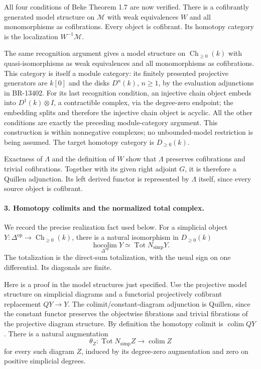 \documentclass[11pt,a4paper]{article}
\theoremstyle{definition}\newtheorem{definition}[theorem]{Definition}
\theoremstyle{remark}\newtheorem{remark}[theorem]{Remark}
\begin{document}
All four conditions of Beke Theorem 1.7 are now verified.
There is a cofibrantly generated model structure on
\(\mathcal M\) with weak equivalences \(W\) and all monomorphisms
as cofibrations.  Every object is cofibrant.  Its homotopy
category is the localization \(W^{-1}\mathcal M\).

The same recognition argument gives a model structure on
\(\operatorname{Ch}_{\ge0}(k)\) with quasi-isomorphisms as weak
equivalences and all monomorphisms as cofibrations.
This category is itself a module category: its finitely presented
projective generators are \(k[0]\) and the disks \(D^n(k)\),
\(n\ge1\), by the evaluation adjunctions in BR-13402.
For its last recognition condition, an injective chain object
embeds into \(D^1(k)\otimes I\), a contractible complex, via
the degree-zero endpoint; the embedding splits and therefore
the injective chain object is acyclic.  All the other
conditions are exactly the preceding module-category argument.
This construction is within nonnegative complexes; no
unbounded-model restriction is being assumed.
The target homotopy category is \(D_{\ge0}(k)\).

Exactness of \(\Lambda\) and the definition of \(W\) show that
\(\Lambda\) preserves cofibrations and trivial cofibrations.
Together with its given right adjoint \(G\), it is therefore
a Quillen adjunction.  Its left derived functor is represented
by \(\Lambda\) itself, since every source object is cofibrant.

\paragraph{3. Homotopy colimits and the normalized total complex.}
We record the precise realization fact used below.
For a simplicial object
\(Y:\Delta^{\mathrm{op}}\to\operatorname{Ch}_{\ge0}(k)\),
there is a natural isomorphism in \(D_{\ge0}(k)\)
\[
 \operatorname*{hocolim}_{\Delta^{\mathrm{op}}}Y
       \simeq\operatorname{Tot}N_{\mathrm{simp}}Y.
 \tag{SM29.5}
\]
The totalization is the direct-sum totalization, with the usual
sign on one differential.  Its diagonals are finite.

Here is a proof in the model structures just specified.
Use the projective model structure on simplicial diagrams and
a functorial projectively cofibrant replacement \(QY\to Y\).
The colimit/constant-diagram adjunction is Quillen, since the
constant functor preserves the objectwise fibrations and trivial
fibrations of the projective diagram structure.
By definition the homotopy colimit is \(\operatorname{colim}QY\).
There is a natural augmentation
\[
 \theta_Z:\operatorname{Tot}N_{\mathrm{simp}}Z
              \longrightarrow\operatorname{colim}Z
\]
for every such diagram \(Z\), induced by its degree-zero
augmentation and zero on positive simplicial degrees.
\end{document}
